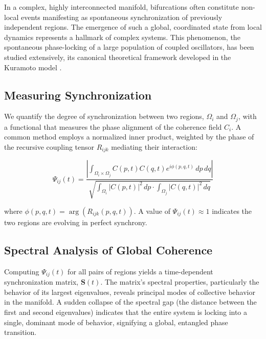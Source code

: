 In a complex, highly interconnected manifold, bifurcations often constitute non-local events manifesting as spontaneous synchronization of previously independent regions. The emergence of such a global, coordinated state from local dynamics represents a hallmark of complex systems. This phenomenon, the spontaneous phase-locking of a large population of coupled oscillators, has been studied extensively, its canonical theoretical framework developed in the Kuramoto model \autocite{Kuramoto1975}.


\subsection{Measuring Synchronization}
\label{sec:measuring_synchronization}

We quantify the degree of synchronization between two regions, \(\Omega_i\) and \(\Omega_j\), with a functional that measures the phase alignment of the coherence field \(C_i\). A common method employs a normalized inner product, weighted by the phase of the recursive coupling tensor \(R_{ijk}\) mediating their interaction:

\begin{equation}
\Psi_{ij}(t) = \frac{\left|\int_{\Omega_i \times \Omega_j} C(p,t)C(q,t)e^{i\phi(p,q,t)} \, dp \, dq\right|}{\sqrt{\int_{\Omega_i} |C(p,t)|^2 \, dp \cdot \int_{\Omega_j} |C(q,t)|^2 \, dq}}
\end{equation}

where \(\phi(p,q,t) = \arg(R_{ijk}(p,q,t))\). A value of \(\Psi_{ij}(t) \approx 1\) indicates the two regions are evolving in perfect synchrony.


\subsection{Spectral Analysis of Global Coherence}
\label{sec:spectral_analysis_of_global_coherence}

Computing \(\Psi_{ij}(t)\) for all pairs of regions yields a time-dependent synchronization matrix, \(\mathbf{S}(t)\). The matrix's spectral properties, particularly the behavior of its largest eigenvalues, reveals principal modes of collective behavior in the manifold. A sudden collapse of the spectral gap (the distance between the first and second eigenvalues) indicates that the entire system is locking into a single, dominant mode of behavior, signifying a global, entangled phase transition. 